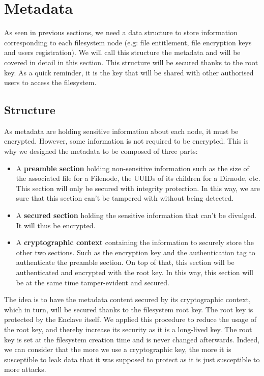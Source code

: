 \documentclass[../main.tex]{subfiles}
\begin{document}
\section{Metadata}
\label{section:lauxus:metadata}

\par As seen in previous sections, we need a data structure to store information corresponding to each filesystem node (e.g: file entitlement, file encryption keys and users registration). We will call this structure the metadata and will be covered in detail in this section. This structure will be secured thanks to the root key. As a quick reminder, it is the key that will be shared with other authorised users to access the filesystem.


\subsection{Structure}
\label{section:lauxus:metadata_structure}

\par As metadata are holding sensitive information about each node, it must be encrypted. However, some information is not required to be encrypted. This is why we designed the metadata to be composed of three parts:
\begin{itemize}
    \item A \textbf{preamble section} holding non-sensitive information such as the size of the associated file for a Filenode, the UUIDs of its children for a Dirnode, etc. This section will only be secured with integrity protection. In this way, we are sure that this section can't be tampered with without being detected.
    \item A \textbf{secured section} holding the sensitive information that can't be divulged. It will thus be encrypted.
    \item A \textbf{cryptographic context} containing the information to securely store the other two sections. Such as the encryption key and the authentication tag to authenticate the preamble section. On top of that, this section will be authenticated and encrypted with the root key. In this way, this section will be at the same time tamper-evident and secured.
\end{itemize}
\par The idea is to have the metadata content secured by its cryptographic context, which in turn, will be secured thanks to the filesystem root key. The root key is protected by the Enclave itself. We applied this procedure to reduce the usage of the root key, and thereby increase its security as it is a long-lived key. The root key is set at the filesystem creation time and is never changed afterwards. Indeed, we can consider that the more we use a cryptographic key, the more it is susceptible to leak data that it was supposed to protect as it is just susceptible to more attacks.
\end{document}
